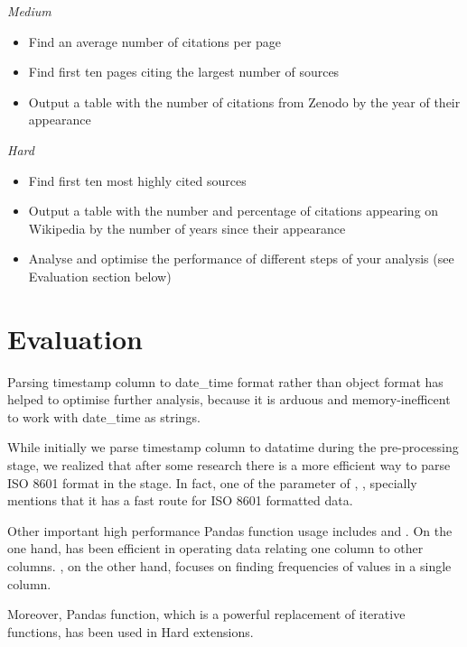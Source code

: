 \documentclass[12pt,a4paper,final]{article}
\begin{document}
\begin{center} \emph{Medium} \end{center}
\begin{itemize}[noitemsep]
    \item Find an average number of citations per page
    \item Find first ten pages citing the largest number of sources
    \item Output a table with the number of citations from Zenodo by the year of their appearance
\end{itemize}

\begin{center} \emph{Hard} \end{center}
\begin{itemize}[noitemsep]
    \item Find first ten most highly cited sources
    \item Output a table with the number and percentage of citations appearing on Wikipedia by the number of years since their appearance
    \item Analyse and optimise the performance of different steps of your analysis (see Evaluation section below)
\end{itemize}

\section*{Evaluation}
Parsing timestamp column to date_time format rather than object format has helped to optimise further analysis, because it is arduous and memory-inefficent to work with date_time as strings.

While initially we parse timestamp column to datatime during the pre-processing stage, we realized that after some research there is a more efficient way to parse ISO 8601 format in the  stage.
In fact, one of the parameter of , , specially mentions that it has a fast route for ISO 8601 formatted data.

Other important high performance Pandas function usage includes  and . On the one hand,  has been efficient in operating data relating one column to other columns.
, on the other hand, focuses on finding frequencies of values in a single column.

Moreover, Pandas  function, which is a powerful replacement of iterative functions, has been used in Hard extensions.
\end{document}

